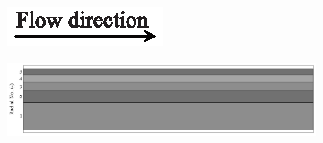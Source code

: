 \documentclass[preprint,12pt]{elsarticle}
\begin{document}
\begin{figure}[h!]
     \centering
     \begin{subfigure}[b]{\textwidth}
     	\includegraphics[width=\textwidth]{flow_dir.eps}
     \end{subfigure}
     \begin{subfigure}[b]{0.85\textwidth}
\includegraphics[width=\textwidth]{results/segments/5segEq/20C80T/seg.png}
     \end{subfigure}
     \hfill
     \begin{subfigure}[b]{0.1\textwidth}

\end{subfigure}
\end{figure}
\end{document}

